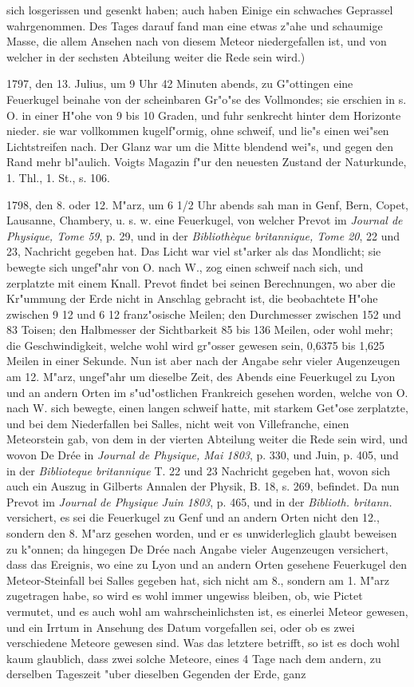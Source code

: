 \documentclass[a4paper, 11pt, oneside, polutonikogreek, german]{article}
\begin{document}
sich losgerissen und gesenkt haben; auch haben Einige ein schwaches Geprassel wahrgenommen. Des Tages darauf fand man eine etwas z"ahe und schaumige Masse, die allem Ansehen nach von diesem Meteor niedergefallen ist, und von welcher in der sechsten Abteilung weiter die Rede sein wird.)

1797, den 13. Julius, um 9 Uhr 42 Minuten abends, zu G"ottingen eine Feuerkugel beinahe von der scheinbaren Gr"o"se des Vollmondes; sie erschien in s. O. in einer H"ohe von 9 bis 10 Graden, und fuhr senkrecht hinter dem Horizonte nieder. sie war vollkommen kugelf"ormig, ohne schweif, und lie"s einen wei"sen Lichtstreifen nach. Der Glanz war um die Mitte blendend wei"s, und gegen den Rand mehr bl"aulich. Voigts Magazin f"ur den neuesten Zustand der Naturkunde, 1. Thl., 1. St., s. 106.

1798, den 8. oder 12. M"arz, um 6 1/2 Uhr abends sah man in Genf, Bern, Copet, Lausanne, Chambery, u. s. w. eine Feuerkugel, von welcher Prevot im \emph{Journal de Physique, Tome 59}, p. 29, und in der \emph{Bibliothèque britannique, Tome 20}, 22 und 23, Nachricht gegeben hat. Das Licht war viel st"arker als das Mondlicht; sie bewegte sich ungef"ahr von O. nach W., zog einen schweif nach sich, und zerplatzte mit einem Knall. Prevot findet bei seinen Berechnungen, wo aber die Kr"ummung der Erde nicht in Anschlag gebracht ist, die beobachtete H"ohe zwischen 9 12 und 6 12 franz"osische Meilen; den Durchmesser zwischen 152 und 83 Toisen; den Halbmesser der Sichtbarkeit 85 bis 136 Meilen, oder wohl mehr; die Geschwindigkeit, welche wohl wird gr"osser gewesen sein, 0,6375 bis 1,625 Meilen in einer Sekunde. Nun ist aber nach der Angabe sehr vieler Augenzeugen am 12. M"arz, ungef"ahr um dieselbe Zeit, des Abends eine Feuerkugel zu Lyon und an andern Orten im s"ud"ostlichen Frankreich gesehen worden, welche von O. nach W. sich bewegte, einen langen schweif hatte, mit starkem Get"ose zerplatzte, und bei dem Niederfallen bei Salles, nicht weit von Villefranche, einen Meteorstein gab, von dem in der vierten Abteilung weiter die Rede sein wird, und wovon De Drée in \emph{Journal de Physique, Mai 1803}, p. 330, und Juin, p. 405, und in der \emph{Biblioteque britannique} T. 22 und 23 Nachricht gegeben hat, wovon sich auch ein Auszug in Gilberts Annalen der Physik, B. 18, s. 269, befindet. Da nun Prevot im \emph{Journal de Physique Juin 1803}, p. 465, und in der \emph{Biblioth. britann.} versichert, es sei die Feuerkugel zu Genf und an andern Orten nicht den 12., sondern den 8. M"arz gesehen worden, und er es unwiderleglich glaubt beweisen zu k"onnen; da hingegen De Drée nach Angabe vieler Augenzeugen versichert, dass das Ereignis, wo eine zu Lyon und an andern Orten gesehene Feuerkugel den Meteor-Steinfall bei Salles gegeben hat, sich nicht am 8., sondern am 1. M"arz zugetragen habe, so wird es wohl immer ungewiss bleiben, ob, wie Pictet vermutet, und es auch wohl am wahrscheinlichsten ist, es einerlei Meteor gewesen, und ein Irrtum in Ansehung des Datum vorgefallen sei, oder ob es zwei verschiedene Meteore gewesen sind. Was das letztere betrifft, so ist es doch wohl kaum glaublich, dass zwei solche Meteore, eines 4 Tage nach dem andern, zu derselben Tageszeit "uber dieselben Gegenden der Erde, ganz 
\end{document}
